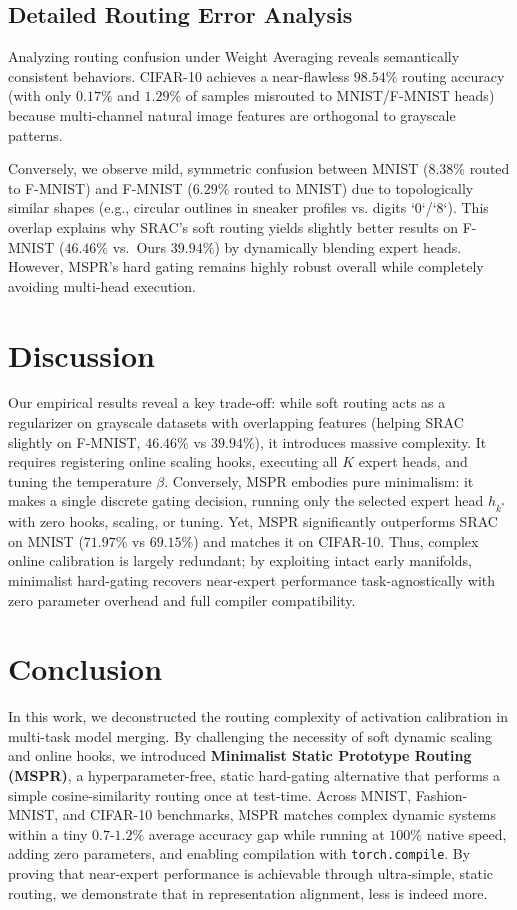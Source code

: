 \documentclass{article}
\theoremstyle{plain}
\theoremstyle{definition}
\theoremstyle{remark}
\begin{document}
\subsection{Detailed Routing Error Analysis}
Analyzing routing confusion under Weight Averaging reveals semantically consistent behaviors. CIFAR-10 achieves a near-flawless $98.54\%$ routing accuracy (with only $0.17\%$ and $1.29\%$ of samples misrouted to MNIST/F-MNIST heads) because multi-channel natural image features are orthogonal to grayscale patterns. 

Conversely, we observe mild, symmetric confusion between MNIST ($8.38\%$ routed to F-MNIST) and F-MNIST ($6.29\%$ routed to MNIST) due to topologically similar shapes (e.g., circular outlines in sneaker profiles vs. digits `0`/`8`). This overlap explains why SRAC's soft routing yields slightly better results on F-MNIST ($46.46\%$ vs.\ Ours $39.94\%$) by dynamically blending expert heads. However, MSPR's hard gating remains highly robust overall while completely avoiding multi-head execution.

\section{Discussion}
\label{submission-discussion}
\enlargethispage{2\baselineskip}
Our empirical results reveal a key trade-off: while soft routing acts as a regularizer on grayscale datasets with overlapping features (helping SRAC slightly on F-MNIST, $46.46\%$ vs $39.94\%$), it introduces massive complexity. It requires registering online scaling hooks, executing all $K$ expert heads, and tuning the temperature $\beta$. Conversely, MSPR embodies pure minimalism: it makes a single discrete gating decision, running only the selected expert head $h_{k^*}$ with zero hooks, scaling, or tuning. Yet, MSPR significantly outperforms SRAC on MNIST ($71.97\%$ vs $69.15\%$) and matches it on CIFAR-10. Thus, complex online calibration is largely redundant; by exploiting intact early manifolds, minimalist hard-gating recovers near-expert performance task-agnostically with zero parameter overhead and full compiler compatibility.

\section{Conclusion}
\label{submission-conclusion}
In this work, we deconstructed the routing complexity of activation calibration in multi-task model merging. By challenging the necessity of soft dynamic scaling and online hooks, we introduced \textbf{Minimalist Static Prototype Routing (MSPR)}, a hyperparameter-free, static hard-gating alternative that performs a simple cosine-similarity routing once at test-time. Across MNIST, Fashion-MNIST, and CIFAR-10 benchmarks, MSPR matches complex dynamic systems within a tiny $0.7$-$1.2\%$ average accuracy gap while running at $100\%$ native speed, adding zero parameters, and enabling compilation with \texttt{torch.compile}. By proving that near-expert performance is achievable through ultra-simple, static routing, we demonstrate that in representation alignment, less is indeed more.
\end{document}
